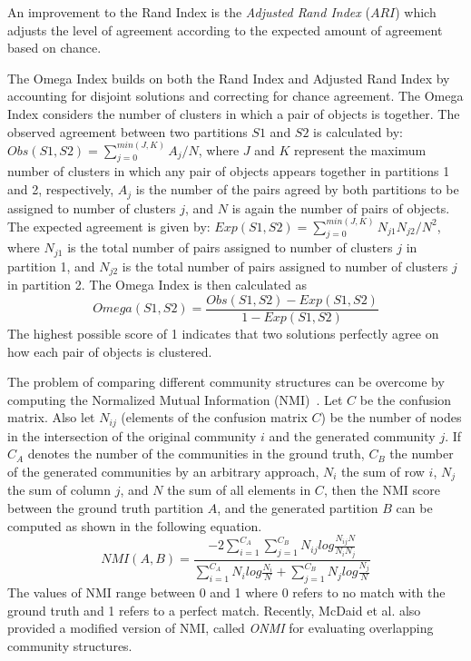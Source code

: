 An improvement to the Rand Index is the {\em Adjusted Rand Index} ($ARI$) \cite{hubert1985} which adjusts the level of agreement according
to the expected amount of agreement based on chance. 

 The Omega Index \cite{collins1988} builds on both the Rand Index and Adjusted Rand Index by accounting for
disjoint solutions and correcting for chance agreement. The Omega Index considers the number of clusters in which a pair of objects is
together. The observed agreement between two partitions $S1$ and $S2$ is calculated by: $Obs(S1,S2)=\sum_{j=0}^{min(J,K)} A_j/N$, where $J$
and $K$ represent
the maximum number of clusters in which any pair of objects appears together in partitions 1 and 2, respectively, $A_j$ is the number of the
pairs agreed by both partitions to be assigned to number of clusters $j$, and $N$ is again the number of pairs of objects. The expected
agreement is given by: $Exp(S1,S2)=\sum_{j=0}^{min(J,K)} N_{j1}N_{j2}/N^2$, where $N_{j1}$ is the total number of pairs assigned to number
of clusters $j$ in partition 1, and $N_{j2}$ is the total number of pairs assigned to number of clusters $j$ in partition 2. The Omega Index
is then calculated as
\begin{equation}
 Omega(S1,S2)=\frac{Obs(S1,S2) - Exp(S1,S2)}{1-Exp(S1,S2)}
\end{equation}
The highest possible score of 1 indicates that two solutions perfectly agree on how each pair of objects is clustered.






 The problem of comparing different community structures can be overcome by
computing
the
Normalized Mutual Information (NMI)~\cite{Vinh:2009}. Let $C$ be the confusion matrix. Also let $N_{ij}$ (elements of the confusion matrix
$C$) be the number of nodes in the intersection of the original community $i$ and the generated community $j$. If $C_A$ denotes the number
of the communities in the ground truth, $C_B$ the number of the generated communities by an arbitrary approach, $N_i$ the sum of row
$i$, $N_j$ the
sum of column $j$, and $N$ the sum of all elements in $C$, then the NMI score between the ground truth partition $A$, and the generated
partition $B$ can be computed as shown in the following equation.
\begin{equation}
 NMI(A,B)=\frac{-2\sum\limits_{i=1}^{C_A}\sum\limits_{j=1}^{C_B}N_{ij}log\frac{N_{ij}N}{N_iN_j}}
{\sum\limits_{i=1}^{C_A}{N_i}log\frac{N_i}{N}+\sum\limits_{j=1}^{C_B}{N_j}log\frac{N_j}{N} }
\end{equation}
The values of NMI range between 0 and 1 where 0 refers to no match with the ground truth and 1 refers to a perfect match. Recently, McDaid
et al. \cite{McDaid} also provided a modified version of NMI, called {\em ONMI} for evaluating  overlapping community structures. 

